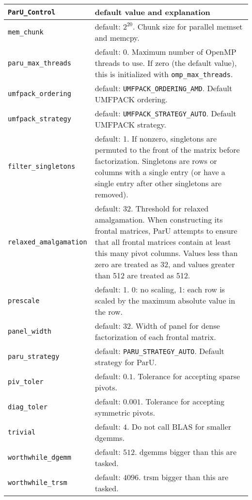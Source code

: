\documentclass[12pt]{article}
\begin{document}
    \vspace{0.1in}
    {\footnotesize
    \begin{tabular}{|lp{4in}|}
    \hline
    \verb'ParU_Control' & default value and explanation  \\
    \hline\hline
    \verb'mem_chunk' & default: $2^{20}$. Chunk size for parallel memset and memcpy. \\
    \verb'paru_max_threads' & default: $0$.  Maximum number of OpenMP threads to use.
        If zero (the default value), this is initialized with \verb'omp_max_threads'. \\
    \hline
    \verb'umfpack_ordering' & default: \verb'UMFPACK_ORDERING_AMD'. Default UMFPACK ordering. \\
    \verb'umfpack_strategy' & default: \verb'UMFPACK_STRATEGY_AUTO'. Default UMFPACK strategy. \\
    \verb'filter_singletons' & default: 1. If nonzero, singletons are
        permuted to the front of the matrix before factorization.  Singletons
        are rows or columns with a single entry (or have a single entry after
        other singletons are removed). \\
    \verb'relaxed_amalgamation' & default: 32. Threshold for relaxed amalgamation. When
        constructing its frontal matrices, ParU attempts to ensure that all
        frontal matrices contain at least this many pivot columns.  Values less
        than zero are treated as 32, and values greater than 512 are treated
        as 512. \\
    \hline
    \verb'prescale' & default: 1. 0: no scaling,
        1: each row is scaled by the maximum
        absolute value in the row. \\
    \verb'panel_width' & default: 32. Width of panel for dense factorization of each frontal matrix. \\
    \verb'paru_strategy' & default: \verb'PARU_STRATEGY_AUTO'. Default strategy for ParU. \\
    \verb'piv_toler' & default: $0.1$. Tolerance for accepting sparse pivots. \\
    \verb'diag_toler' & default: $0.001$. Tolerance for accepting symmetric pivots. \\
    \verb'trivial' & default: $4$. Do not call BLAS for smaller dgemms. \\
    \verb'worthwhile_dgemm' & default: $512$. dgemms bigger than this are tasked. \\
    \verb'worthwhile_trsm' & default: $4096$. trsm bigger than this are tasked. \\
    \hline
    \end{tabular}
    }
    \vspace{0.1in}
\end{document}

